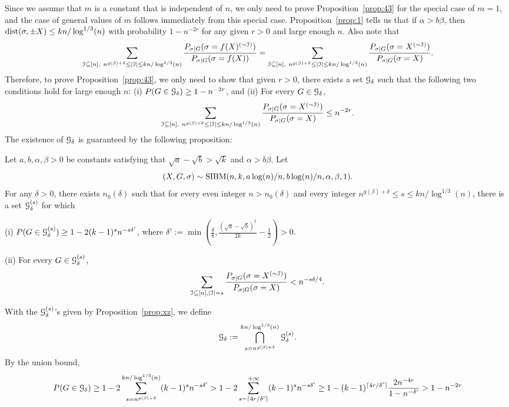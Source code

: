 \documentclass{article}
\begin{document}
Since we assume that $m$ is a constant that is independent of $n$,
we only need to prove Proposition~\ref{prop:43} for the special case of $m=1$, and the case of general values of $m$ follows immediately from this special case.
Proposition~\ref{prop:1} tells us that if $\alpha>b\beta$, then $\operatorname{dist}(\sigma,\pm X) \le kn/\log^{1/3}(n)$
 with probability $1-n^{-2r}$ for any given $r>0$ and large enough $n$.
Also note that
\begin{align*}
 \sum_{\mathcal{I}\subseteq[n],~
n^{g(\beta)+\delta}
\le |\mathcal{I}|\le kn/\log^{1/3}(n)}
\frac{P_{\sigma|G}(\sigma=f(X)^{(\sim\mathcal{I})})}{P_{\sigma|G}(\sigma=f(X))} 
=  \sum_{\mathcal{I}\subseteq[n],~
n^{g(\beta)+\delta}
\le |\mathcal{I}|\le kn/\log^{1/3}(n)}
\frac{P_{\sigma|G}(\sigma=X^{(\sim\mathcal{I})})}{P_{\sigma|G}(\sigma=X)} .
\end{align*}
Therefore, to prove Proposition~\ref{prop:43}, we only need to show that given $r>0$, there exists a set $\mathcal{G}_{\delta}$ such that the following two conditions hold for large enough $n$:  (i)
$P(G\in\mathcal{G}_{\delta})\ge 1-n^{-2r}$, and (ii)
For every $G\in\mathcal{G}_{\delta}$,
$$
\sum_{\mathcal{I}\subseteq[n],~
n^{g(\beta)+\delta}
\le |\mathcal{I}|\le kn/\log^{1/3}(n)}
\frac{P_{\sigma|G}(\sigma=X^{(\sim\mathcal{I})})}{P_{\sigma|G}(\sigma=X)} \le n^{-2r} .
$$
The existence of $\mathcal{G}_{\delta}$ is guaranteed by the following proposition:
\begin{proposition} \label{prop:xz}
Let $a,b,\alpha,\beta> 0$ be constants satisfying that $\sqrt{a}-\sqrt{b} > \sqrt{k}$ and $\alpha>b\beta$.
Let 
$$
(X,G,\sigma) \sim \operatorname{SIBM}(n, k, a\log(n)/n, b\log(n)/n,\alpha,\beta, 1) .
$$
For any $\delta>0$, there exists $n_0(\delta)$ such that
for every even integer $n>n_0(\delta)$ and
every integer $n^{g(\beta)+\delta} \le s \le kn/\log^{1/3}(n)$,
there is a set $\mathcal{G}_{\delta}^{(s)}$ for which

\noindent (i)
$P(G\in\mathcal{G}_\delta^{(s)}) \ge 1- 2(k-1)^s n^{-s\delta'}$,
where $\delta':=\min(\frac{\delta}{8},\frac{(\sqrt{a}-\sqrt{b})^2}{2k} - \frac{1}{2}) >0$.

\noindent (ii) For every $G\in\mathcal{G}_\delta^{(s)}$,
$$
\sum_{\mathcal{I}\subseteq[n],|\mathcal{I}|=s}
\frac{P_{\sigma|G}(\sigma=X^{(\sim \mathcal{I})} )}
{P_{\sigma|G}(\sigma=X)} <
n^{-s \delta /4} .
$$
\end{proposition}
With the $\mathcal{G}_\delta^{(s)}$'s given by Proposition~\ref{prop:xz}, we
define 
$$
\mathcal{G}_\delta:=\bigcap_{s=n^{g(\beta)+\delta}}^{kn/\log^{1/3}(n)} \mathcal{G}_\delta^{(s)} .
$$
By the union bound,
$$
P(G\in\mathcal{G}_\delta)\ge 1-2 \sum_{s=n^{g(\beta)+\delta}}^{kn/\log^{1/3}(n)} (k-1)^sn^{-s\delta'}
> 1-2 \sum_{s=\lceil 4r/\delta' \rceil}^{+\infty} (k-1)^sn^{-s\delta'}
\ge 1- (k-1)^{\lceil 4r/\delta' \rceil}\frac{2 n^{-4r}}{1-n^{-\delta'}}
>1-n^{-2r}
$$
\end{document}
